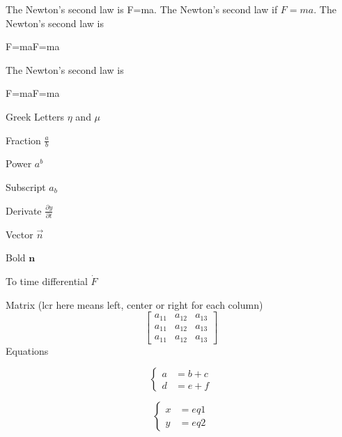 \documentclass{article}
\begin{document}
	The Newton's second law is F=ma.
	The Newton's second law if $F=ma$.
	The Newton's second law is 
	
	
	F=maF=ma
	
	
	The Newton's second law is 
	
	
	
	F=maF=ma
	
	
	Greek Letters $\eta$ and $\mu$
	
	Fraction $\frac{a}{b}$
	
	Power $a^b$
	
	Subscript $a_b$
	
	Derivate $\frac{\partial y}{\partial t}$
	
	Vector $\vec{n}$
	
	Bold $\mathbf{n}$
	
	To time differential $\dot{F}$
	
	Matrix (lcr here means left, center or right for each column) 
	\begin{equation}
	\left[
	\begin{array}{cccc}
	a_{11}&  a_{12} & a_{13}\\
	a_{11}& a_{12} & a_{13}\\
	a_{11}& a_{12} & a_{13}
	\end{array}
	\right ]
	\end{equation}
	Equations
	
	\begin{equation}
\begin{cases}
a&=b+c\\
d&=e+f
\end{cases}
\end{equation}

	\begin{equation}
\left\{
\begin{array} {rl}
x&=eq1\\
y&=eq2
\end{array}
\right.
\end{equation}
	
	
		
\end{document}

